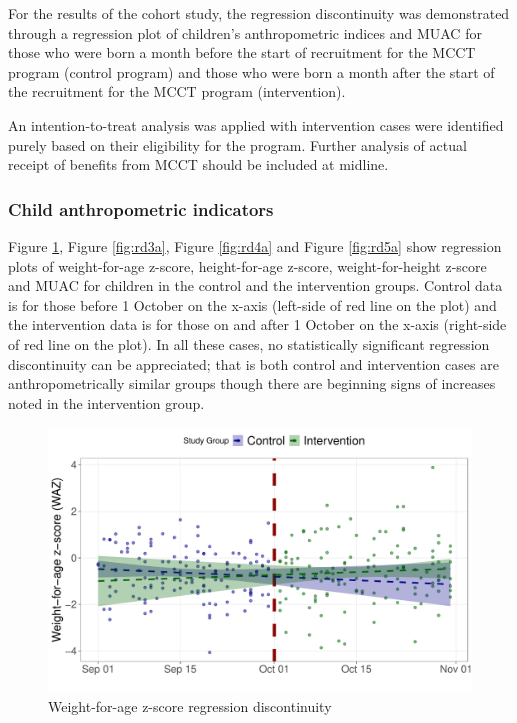 \documentclass[12pt,a4paper]{article}
\begin{document}
For the results of the cohort study, the regression discontinuity was demonstrated through a regression plot of children's anthropometric indices and MUAC for those who were born a month before the start of recruitment for the MCCT program (control program) and those who were born a month after the start of the recruitment for the MCCT program (intervention).

An intention-to-treat analysis was applied with intervention cases were identified purely based on their eligibility for the program. Further analysis of actual receipt of benefits from MCCT should be included at midline.

\hypertarget{child-anthropometric-indicators}{%
\subsubsection{Child anthropometric indicators}\label{child-anthropometric-indicators}}

Figure \ref{fig:rd2a}, Figure \ref{fig:rd3a}, Figure \ref{fig:rd4a} and Figure \ref{fig:rd5a} show regression plots of weight-for-age z-score, height-for-age z-score, weight-for-height z-score and MUAC for children in the control and the intervention groups. Control data is for those before 1 October on the x-axis (left-side of red line on the plot) and the intervention data is for those on and after 1 October on the x-axis (right-side of red line on the plot). In all these cases, no statistically significant regression discontinuity can be appreciated; that is both control and intervention cases are anthropometrically similar groups though there are beginning signs of increases noted in the intervention group.

\begin{figure}[H]

{\centering \includegraphics{kayinReport_files/figure-latex/rd2a-1} 

}

\caption{Weight-for-age z-score regression discontinuity}\label{fig:rd2a}
\end{figure}
\end{document}
